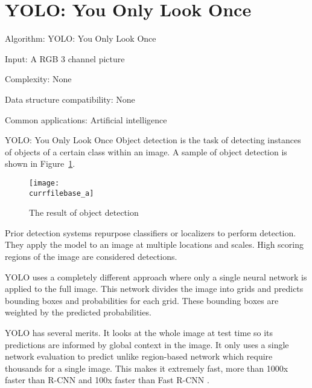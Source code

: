 \documentclass[catalog.tex]{subfiles}
\begin{document}
\def\pbname{YOLO: You Only Look Once} %

\section{\pbname} 

\begin{overview}
\item [Algorithm:] YOLO: You Only Look Once
\item [Input:] A RGB 3 channel picture
\item [Complexity:] None
\item [Data structure compatibility:] None
\item [Common applications:] Artificial intelligence
\end{overview}


\begin{problem}{\pbname}
Object detection is the task of detecting instances of objects of a certain class within an image. A sample of object detection is shown in Figure~\ref{fig:\currfilebase_a}.
\begin{figure}[!htb]
\centering
\texttt{[image: \\currfilebase\_a]}
	\caption{The result of object detection}
	\label{fig:\currfilebase_a}
\end{figure}
Prior detection systems \cite{ren2015faster} repurpose classifiers or localizers to perform detection. They apply the model to an image at multiple locations and scales. High scoring regions of the image are considered detections.

\smallskip
YOLO \cite{redmon2016you} uses a completely different approach where only a single neural network is applied to the full image. This network divides the image into grids and predicts bounding boxes and probabilities for each grid. These bounding boxes are weighted by the predicted probabilities.

\smallskip
YOLO has several merits. It looks at the whole image at test time so its predictions are informed by global context in the image. 
It only uses a single network evaluation to predict unlike region-based network which require thousands for a single image. 
This makes it extremely fast, more than 1000x faster than R-CNN \cite{girshick2015region} and 100x faster than Fast R-CNN \cite{girshick2015fast}.
\end{problem}
\end{document}
